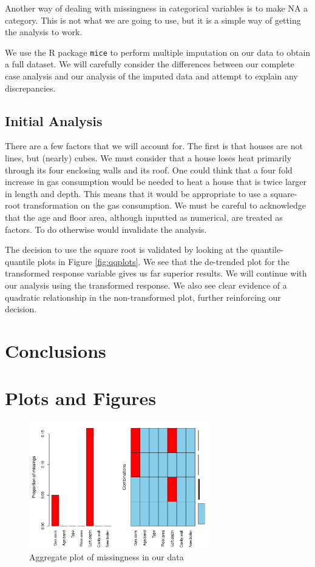 \documentclass[11pt]{article}
\begin{document}
Another way of dealing with missingness in categorical variables is to make NA a category. This is not what we are going to use, but it is a simple way of getting the analysis to work.

We use the R package \texttt{mice} to perform multiple imputation on our data to obtain a full dataset. We will carefully consider the differences between our complete case analysis and our analysis of the imputed data and attempt to explain any discrepancies. 

\subsection{Initial Analysis}

There are a few factors that we will account for. The first is that houses are not lines, but (nearly) cubes. We must consider that a house loses heat primarily through its four enclosing walls and its roof. One could think that a four fold increase in gas consumption would be needed to heat a house that is twice larger in length and depth. This means that it would be appropriate to use a square-root transformation on the gas consumption. We must be careful to acknowledge that the age and floor area, although inputted as numerical, are treated as factors. To do otherwise would invalidate the analysis.

The decision to use the square root is validated by looking at the quantile-quantile plots in Figure \ref{fig:qqplots}. We see that the de-trended plot for the transformed response variable gives us far superior results. We will continue with our analysis using the transformed response. We also see clear evidence of a quadratic relationship in the non-transformed plot, further reinforcing our decision. 


\section{Conclusions}



\appendix

\section{Plots and Figures}

\begin{figure}[H]
	\centering
	\includegraphics[width=0.7\textwidth]{aggre_missplot}
	\caption{Aggregate plot of missingness in our data}
	\label{fig:aggrmiss}
\end{figure}
\end{document}
